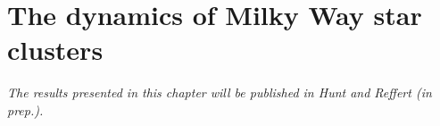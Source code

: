 %
\chapter{The dynamics of Milky Way star clusters}
\label{sec:dynamics}


\emph{The results presented in this chapter will be published in Hunt and Reffert (\emph{in prep.}).}

